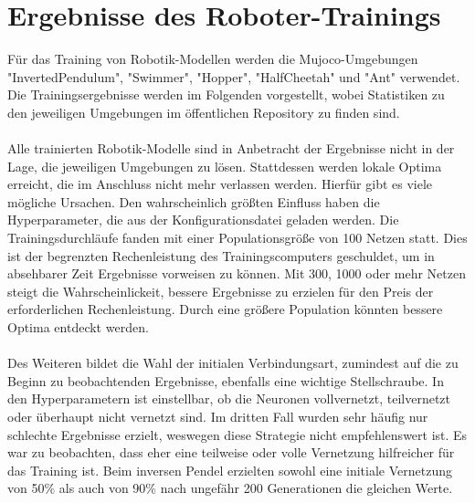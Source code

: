 \section{Ergebnisse des Roboter-Trainings}
Für das Training von Robotik-Modellen werden die Mujoco-Umgebungen "InvertedPendulum", "Swimmer", "Hopper", "HalfCheetah" und "Ant" verwendet. Die Trainingsergebnisse werden im Folgenden vorgestellt, wobei Statistiken zu den jeweiligen Umgebungen im öffentlichen Repository zu finden sind.
\\
\\
Alle trainierten Robotik-Modelle sind in Anbetracht der Ergebnisse nicht in der Lage, die jeweiligen Umgebungen zu lösen. Stattdessen werden lokale Optima erreicht, die im Anschluss nicht mehr verlassen werden. Hierfür gibt es viele mögliche Ursachen. Den wahrscheinlich größten Einfluss haben die Hyperparameter, die aus der Konfigurationsdatei geladen werden. Die Trainingsdurchläufe fanden mit einer Populationsgröße von 100 Netzen statt. Dies ist der begrenzten Rechenleistung des Trainingscomputers geschuldet, um in absehbarer Zeit Ergebnisse vorweisen zu können. Mit 300, 1000 oder mehr Netzen steigt die Wahrscheinlickeit, bessere Ergebnisse zu erzielen für den Preis der erforderlichen Rechenleistung. Durch eine größere Population könnten bessere Optima entdeckt werden.
\\
\\
Des Weiteren bildet die Wahl der initialen Verbindungsart, zumindest auf die zu Beginn zu beobachtenden Ergebnisse, ebenfalls eine wichtige Stellschraube. In den Hyperparametern ist einstellbar, ob die Neuronen vollvernetzt, teilvernetzt oder überhaupt nicht vernetzt sind. Im dritten Fall wurden sehr häufig nur schlechte Ergebnisse erzielt, weswegen diese Strategie nicht empfehlenswert ist. Es war zu beobachten, dass eher eine teilweise oder volle Vernetzung hilfreicher für das Training ist. Beim inversen Pendel erzielten sowohl eine initiale Vernetzung von 50\% als auch von 90\% nach ungefähr 200 Generationen die gleichen Werte.

